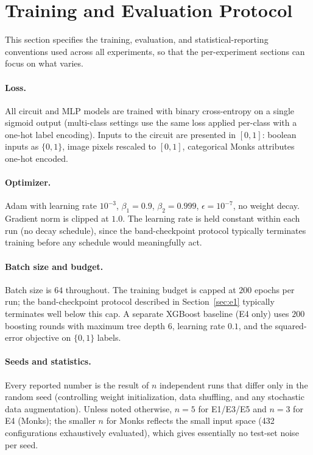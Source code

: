 \documentclass{article}
\begin{document}
\section{Training and Evaluation Protocol}
\label{sec:protocol}

This section specifies the training, evaluation, and statistical-reporting conventions used across all experiments, so that the per-experiment sections can focus on what varies.

\paragraph{Loss.}
All circuit and MLP models are trained with binary cross-entropy on a single sigmoid output (multi-class settings use the same loss applied per-class with a one-hot label encoding).
Inputs to the circuit are presented in $[0,1]$: boolean inputs as $\{0, 1\}$, image pixels rescaled to $[0,1]$, categorical Monks attributes one-hot encoded.

\paragraph{Optimizer.}
Adam with learning rate $10^{-3}$, $\beta_1 = 0.9$, $\beta_2 = 0.999$, $\epsilon = 10^{-7}$, no weight decay.
Gradient norm is clipped at $1.0$.
The learning rate is held constant within each run (no decay schedule), since the band-checkpoint protocol typically terminates training before any schedule would meaningfully act.

\paragraph{Batch size and budget.}
Batch size is $64$ throughout.
The training budget is capped at $200$ epochs per run; the band-checkpoint protocol described in Section~\ref{sec:e1} typically terminates well below this cap.
A separate XGBoost baseline (E4 only) uses $200$ boosting rounds with maximum tree depth $6$, learning rate $0.1$, and the squared-error objective on $\{0,1\}$ labels.

\paragraph{Seeds and statistics.}
Every reported number is the result of $n$ independent runs that differ only in the random seed (controlling weight initialization, data shuffling, and any stochastic data augmentation).
Unless noted otherwise, $n = 5$ for E1/E3/E5 and $n = 3$ for E4 (Monks); the smaller $n$ for Monks reflects the small input space (432 configurations exhaustively evaluated), which gives essentially no test-set noise per seed.
\end{document}
